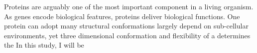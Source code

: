 Proteins are arguably one of the most important component in a living organism. As genes encode biological features, proteins deliver biological functions. One protein can adopt many structural conformations largely depend on sub-cellular environments, yet three dimensional conformation and flexibility of a  determines the     In this study, I will be 